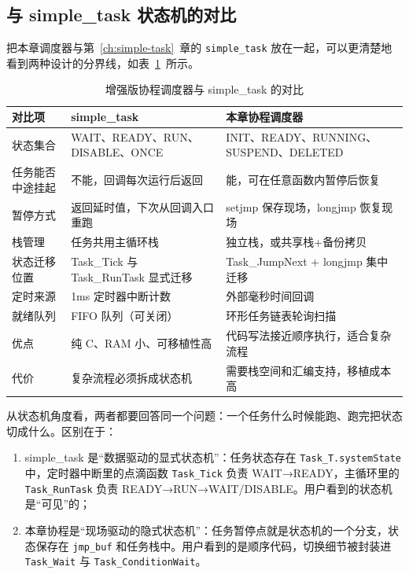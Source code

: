 \subsection{与 simple\_task 状态机的对比}

把本章调度器与第~\ref{ch:simple-task}~章的 \texttt{simple\_task} 放在一起，可以更清楚地看到两种设计的分界线，如表~\ref{tab:coro-vs-simple}~所示。

\begin{table}[htbp]
	\centering
	\small
	\caption{增强版协程调度器与 simple\_task 的对比}
	\label{tab:coro-vs-simple}
	\begin{tabularx}{\textwidth}{l X X}   %
		\toprule
		对比项 & simple\_task & 本章协程调度器 \\
		\midrule
		状态集合 & WAIT、READY、RUN、DISABLE、ONCE & INIT、READY、RUNNING、SUSPEND、DELETED \\
		任务能否中途挂起 & 不能，回调每次运行后返回 & 能，可在任意函数内暂停后恢复 \\
		暂停方式 & 返回延时值，下次从回调入口重跑 & setjmp 保存现场，longjmp 恢复现场 \\
		栈管理 & 任务共用主循环栈 & 独立栈，或共享栈+备份拷贝 \\
		状态迁移位置 & Task\_Tick 与 Task\_RunTask 显式迁移 & Task\_JumpNext + longjmp 集中迁移 \\
		定时来源 & 1ms 定时器中断计数 & 外部毫秒时间回调 \\
		就绪队列 & FIFO 队列（可关闭） & 环形任务链表轮询扫描 \\
		优点 & 纯 C、RAM 小、可移植性高 & 代码写法接近顺序执行，适合复杂流程 \\
		代价 & 复杂流程必须拆成状态机 & 需要栈空间和汇编支持，移植成本高 \\
		\bottomrule
	\end{tabularx}
\end{table}

从状态机角度看，两者都要回答同一个问题：一个任务什么时候能跑、跑完把状态切成什么。区别在于：

\begin{enumerate}
	\item simple\_task 是“数据驱动的显式状态机”：任务状态存在 \texttt{Task\_T.systemState} 中，定时器中断里的点滴函数 \texttt{Task\_Tick} 负责 WAIT→READY，主循环里的 \texttt{Task\_RunTask} 负责 READY→RUN→WAIT/DISABLE。用户看到的状态机是“可见”的；
	\item 本章协程是“现场驱动的隐式状态机”：任务暂停点就是状态机的一个分支，状态保存在 \texttt{jmp\_buf} 和任务栈中。用户看到的是顺序代码，切换细节被封装进 \texttt{Task\_Wait} 与 \texttt{Task\_ConditionWait}。
\end{enumerate}

